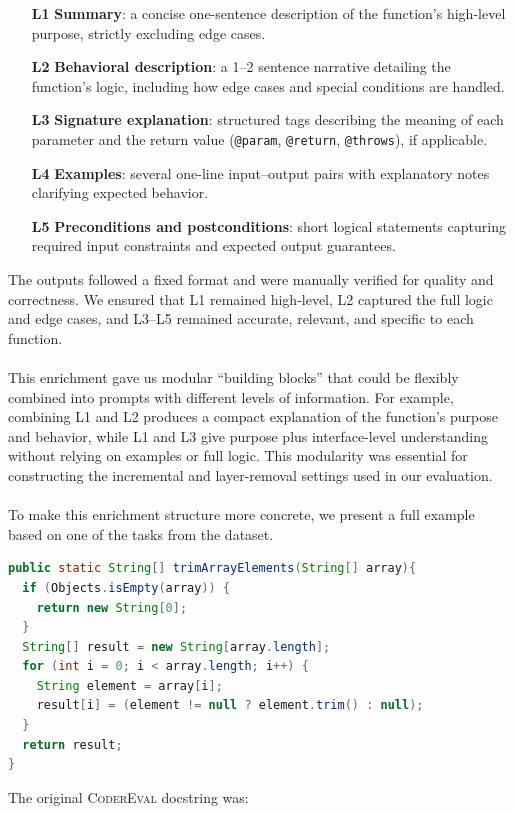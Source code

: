 \documentclass[a4paper]{usiinfbachelorproject}
\begin{document}
\begin{enumerate}[leftmargin=15pt]
  \item[\textbf{L1}] \textbf{Summary}: a concise one-sentence description of the function's high-level purpose, strictly excluding edge cases.
  \item[\textbf{L2}] \textbf{Behavioral description}: a 1--2 sentence narrative detailing the function’s logic, including how edge cases and special conditions are handled.
  \item[\textbf{L3}] \textbf{Signature explanation}: structured tags describing the meaning of each parameter and the return value (\texttt{@param}, \texttt{@return}, \texttt{@throws}), if applicable.
  \item[\textbf{L4}] \textbf{Examples}: several one-line input–output pairs with explanatory notes clarifying expected behavior.
  \item[\textbf{L5}] \textbf{Preconditions and postconditions}: short logical statements capturing required input constraints and expected output guarantees.
\end{enumerate}
The outputs followed a fixed format and were manually verified for quality and correctness. We ensured that L1 remained high-level, L2 captured the full logic and edge cases, and L3–L5 remained accurate, relevant, and specific to each function.\\
\\[2pt]
This enrichment gave us modular “building blocks” that could be flexibly combined into prompts with different levels of information. For example, combining L1 and L2 produces a compact explanation of the function’s purpose and behavior, while L1 and L3 give purpose plus interface-level understanding without relying on examples or full logic. This modularity was essential for constructing the incremental and layer-removal settings used in our evaluation.\\
\\[2pt]
To make this enrichment structure more concrete, we present a full example based on one of the tasks from the dataset.

\begin{lstlisting}[language=Java, caption={Reference implementation of \texttt{trimArrayElements}}, label={lst:trim}]
public static String[] trimArrayElements(String[] array){
  if (Objects.isEmpty(array)) {
    return new String[0];
  }
  String[] result = new String[array.length];
  for (int i = 0; i < array.length; i++) {
    String element = array[i];
    result[i] = (element != null ? element.trim() : null);
  }
  return result;
}
\end{lstlisting}
The original \textsc{CoderEval} docstring was:
\end{document}
